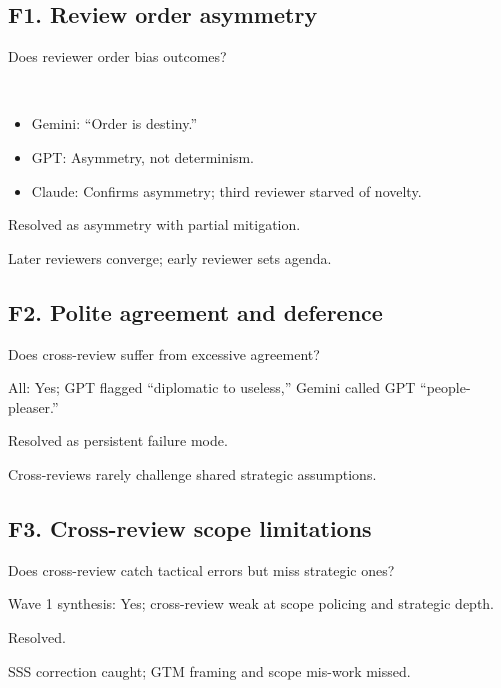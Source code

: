 \documentclass[11pt,letterpaper]{article}
\begin{document}
\subsection{F1. Review order asymmetry}

\begin{reflist}
\item[Dispute:] Does reviewer order bias outcomes?
\item[Positions:]~
  \begin{itemize}[nosep]
    \item Gemini: ``Order is destiny.''
    \item GPT: Asymmetry, not determinism.
    \item Claude: Confirms asymmetry; third reviewer starved of novelty.
  \end{itemize}
\item[Status:] Resolved as asymmetry with partial mitigation.
\item[Evidence:] Later reviewers converge; early reviewer sets agenda.
\end{reflist}

\subsection{F2. Polite agreement and deference}

\begin{reflist}
\item[Dispute:] Does cross-review suffer from excessive agreement?
\item[Positions:] All: Yes; GPT flagged ``diplomatic to useless,'' Gemini called GPT ``people-pleaser.''
\item[Status:] Resolved as persistent failure mode.
\item[Evidence:] Cross-reviews rarely challenge shared strategic assumptions.
\end{reflist}

\subsection{F3. Cross-review scope limitations}

\begin{reflist}
\item[Dispute:] Does cross-review catch tactical errors but miss strategic ones?
\item[Positions:] Wave 1 synthesis: Yes; cross-review weak at scope policing and strategic depth.
\item[Status:] Resolved.
\item[Evidence:] SSS correction caught; GTM framing and scope mis-work missed.
\end{reflist}
\end{document}
